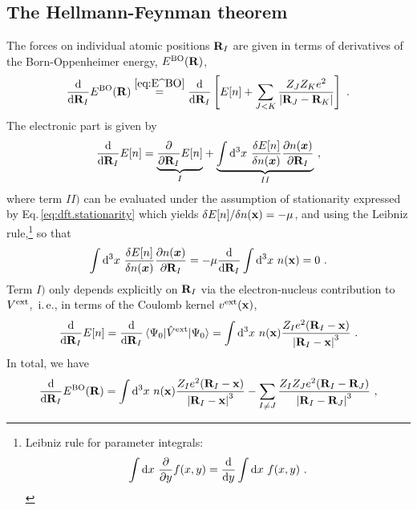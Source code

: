 \subsection{The Hellmann-Feynman theorem}
\label{sec:HellmannFeynman}
The forces on individual atomic positions ${\bf R}_I$ are given in terms of derivatives of the Born-Oppenheimer energy, $E^{\rm BO} ({\bf R})$,
\begin{align}
	\frac{\d}{\d {\bf R}_I} E^{\rm BO} ({\bf R})
		\stackrel{\eqref{eq:E^BO}}{=}
			\frac{\d}{\d {\bf R}_I } \left[
				E[n] + \sum_{J < K} \frac{Z_{J} Z_{K} e^{2}}{\left|{\b R}_{J}-{\bf R}_{K}\right|}
			\right]
			~.
	\label{eq:hellmannfeynman.1}
\end{align}
The electronic part is given by
\begin{align}
		\frac{\d}{\d {\bf R}_I} E[n]
			= 
				\underset{I}{\underbrace{\frac{\partial}{\partial {\bf R}_I} E[n]}}
			+ \underset{II}{\underbrace{
					\int \d^{3} x ~ \frac{\delta E[n]}{\delta n(\boldsymbol{x})} \frac{\partial n(\boldsymbol{x})}{\partial {\bf R}_{I}}
				}}~,
		\label{eq:hellmannfeynman.2}
\end{align}
where term $II)$ can be evaluated under the assumption of stationarity expressed by Eq.\,\eqref{eq:dft.stationarity} which yields 
\mbox{$\delta E[n] / \delta n({\bf x}) = -\mu$},
and using the Leibniz rule,\footnote{Leibniz rule for parameter integrals:
	\begin{align*}
		\int {\rm d} x ~ \frac{\partial}{\partial y} f(x, y) 
			= \frac{{\rm d}}{{\rm d} y} \int {\rm d} x ~ f(x, y)~.
	\end{align*}
} so that
\begin{align}
	\int \d^{3} x ~ \frac{\delta E[n]}{\delta n(\boldsymbol{x})} \frac{\partial n(\boldsymbol{x})}{\partial {\bf R}_{I}}
	= -\mu \frac{\d}{\d {\bf R}_I} \int \d^{3} x ~ n ({\bf x})
	= 0~.
	\label{eq:hellmannfeynman.3}
\end{align}
Term $I)$ only depends explicitly on ${\bf R}_I$ via the electron-nucleus contribution to $V^{\rm ext}$,~i.\,e., in terms of the Coulomb kernel $v^{\rm ext} ({\bf x})$,
\begin{align}
	\frac{{\rm d}}{{\rm d} {\bf R}_I} E[n]
		= \frac{{\rm d}}{{\rm d} {\bf R}_I} \braket{\Psi_0 | \hat V ^{\rm ext} | \Psi_0} 
		= \int {\rm d}^3 x ~ n({\bf x}) \frac{Z_I e^2 ({\bf R}_I - {\bf x})}{\left\lvert {\bf R}_I - {\bf x} \right\rvert^3}~.
\end{align}
In total, we have
\begin{align}
	\frac{\d}{\d {\bf R}_I} E^{\rm BO} ({\bf R})
	= \int \d^3 x ~ n({\bf x}) \frac{Z_I e^2 ({\bf R}_I - {\bf x})}{\left\lvert {\bf R}_I - {\bf x} \right\rvert^3}
	- \sum_{I \neq J} \frac{Z_I Z_J e^2 ({\b R}_{I}-{\bf R}_{J})}{
		\left\lvert {\bf R}_{I}-{\bf R}_{J} \right\rvert^3}~,
	\label{eq:hellmannfeynman.force}
\end{align}
